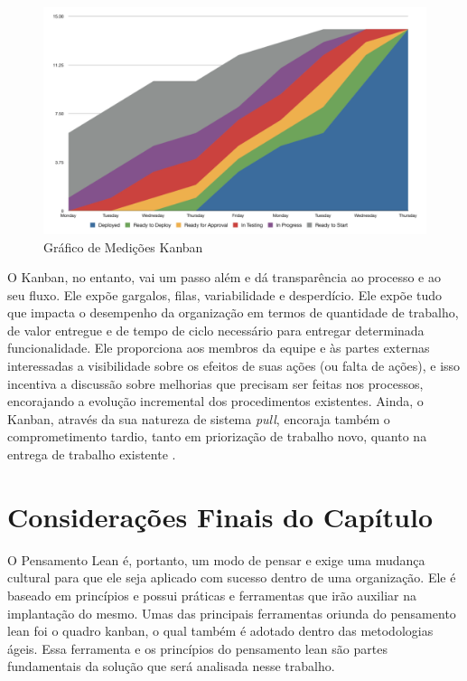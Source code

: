 \begin{figure}[H]
		\centering
		\label{fig05}
			\includegraphics[scale=0.4]{figuras/metricasKanban.png}
		\caption{Gráfico de Medições Kanban  \cite{klipp}}
\end{figure}

O Kanban, no entanto, vai um passo além e dá transparência ao processo e ao seu fluxo. Ele expõe gargalos, filas, variabilidade e desperdício. Ele expõe tudo que impacta o desempenho da organização em termos de quantidade de trabalho, de valor entregue e de tempo de ciclo necessário para entregar determinada funcionalidade. Ele proporciona aos membros da equipe e às partes  externas interessadas a visibilidade sobre os efeitos de suas ações (ou falta de ações), e isso incentiva a discussão sobre melhorias que precisam ser feitas nos processos, encorajando a evolução incremental dos procedimentos existentes. Ainda, o Kanban, através da sua natureza de sistema \textit{pull}, encoraja também o comprometimento tardio, tanto em priorização de trabalho novo, quanto na entrega de trabalho existente \cite{kniberg2009}. 

\section[Considerações Finais do Capítulo]{Considerações Finais do Capítulo}

O Pensamento Lean é, portanto, um modo de pensar e exige uma mudança cultural para que ele seja aplicado com sucesso dentro de uma organização. Ele é baseado em princípios e possui práticas e ferramentas que irão auxiliar na implantação do mesmo. Umas das principais ferramentas oriunda do pensamento lean foi o quadro kanban, o qual também é adotado dentro das metodologias ágeis. Essa ferramenta e os princípios do pensamento lean são partes fundamentais da solução que será analisada nesse trabalho.
